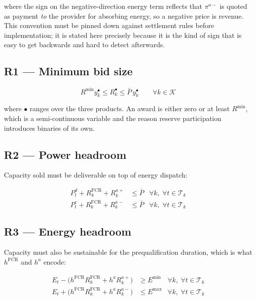 \documentclass[11pt,a4paper]{article}
\numberwithin{equation}{section}
\begin{document}
where the sign on the negative-direction energy term reflects that
$\pi^{a-}$ is quoted as payment \emph{to} the provider for absorbing energy, so
a negative price is revenue. This convention must be pinned down against
settlement rules before implementation; it is stated here precisely because it
is the kind of sign that is easy to get backwards and hard to detect afterwards.

\subsection{R1 --- Minimum bid size}

\begin{equation}
R^{\min} y^{\bullet}_{k} \le R^{\bullet}_{k} \le \bar{P} \, y^{\bullet}_{k}
\qquad \forall k \in \mathcal{K}
\end{equation}

where $\bullet$ ranges over the three products. An award is either zero or at
least $R^{\min}$, which is a semi-continuous variable and the reason reserve
participation introduces binaries of its own.

\subsection{R2 --- Power headroom}

Capacity sold must be deliverable on top of energy dispatch:

\begin{align}
P^{d}_{t} + R^{\text{FCR}}_{k} + R^{a+}_{k} &\le \bar{P}
  & \forall k, \; \forall t \in \mathcal{T}_k \\
P^{c}_{t} + R^{\text{FCR}}_{k} + R^{a-}_{k} &\le \bar{P}
  & \forall k, \; \forall t \in \mathcal{T}_k
\end{align}

\subsection{R3 --- Energy headroom}

Capacity must also be sustainable for the prequalification duration, which is
what $h^{\text{FCR}}$ and $h^{a}$ encode:

\begin{align}
E_{t} - \big( h^{\text{FCR}} R^{\text{FCR}}_{k} + h^{a} R^{a+}_{k} \big)
  &\ge E^{\min} & \forall k, \; \forall t \in \mathcal{T}_k \\
E_{t} + \big( h^{\text{FCR}} R^{\text{FCR}}_{k} + h^{a} R^{a-}_{k} \big)
  &\le E^{\max} & \forall k, \; \forall t \in \mathcal{T}_k
\end{align}
\end{document}
